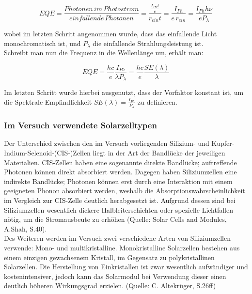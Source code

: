 \begin{equation}
EQE = \frac{Photonen \, im \, Photostrom}{einfallende \, Photonen} = \frac{ \frac{I_{Ph}t}{e}}{r_{ein}t} = \frac{I_{Ph}}{e \, r_{ein}} = \frac{I_{Ph} h \nu}{e P_\lambda}
\end{equation}

wobei im letzten Schritt angenommen wurde, dass das einfallende Licht monochromatisch ist, und $P_\lambda$ die einfallende Strahlungsleistung ist. \\
Schreibt man nun die Frequenz in die Wellenlänge um, erhält man:

\begin{equation}
EQE = \frac{h c}{e} \frac{I_{Ph}}{\lambda P_\lambda} = \frac{h c}{e} \frac{SE(\lambda)}{\lambda}
\end{equation}

Im letzten Schritt wurde hierbei ausgenutzt, dass der Vorfaktor konstant ist, um die Spektrale Empfindlichkeit $SE(\lambda) = \frac{I_{Ph}}{P_\lambda}$ zu definieren.

\subsubsection{Im Versuch verwendete Solarzelltypen}
Der Unterschied zwischen den im Versuch vorliegenden Silizium- und Kupfer-Indium-Selenoid-(CIS-)Zellen liegt in der Art der Bandlücke der jeweiligen Materialien. CIS-Zellen haben eine sogenannte direkte Bandlücke; auftreffende Photonen können direkt absorbiert werden. Dagegen haben Siliziumzellen eine indirekte Bandlücke; Photonen können erst durch eine Interaktion mit einem geeigneten Phonon absorbiert werden, weshalb die Absorptionswahrscheinlichkeit im Vergleich zur CIS-Zelle deutlich herabgesetzt ist. Aufgrund dessen sind bei Siliziumzellen wesentlich dickere Halbleiterschichten oder spezielle Lichtfallen nötig, um die Stromausbeute zu erhöhen (Quelle: Solar Cells and Modules, A.Shah, S.40). \\
Des Weiteren werden im Versuch zwei verschiedene Arten von Siliziumzellen verwende: Mono- und multikristalline. Monokristalline Solarzellen bestehen aus einem einzigen gewachsenem Kristall, im Gegensatz zu polykristallinen Solarzellen. Die Herstellung von Einkristallen ist zwar wesentlich aufwändiger und kostenintensiver, jedoch kann das Solarmodul bei Verwendung dieser einen deutlich höheren Wirkungsgrad erzielen. (Quelle: C. Altekrüger, S.26ff)